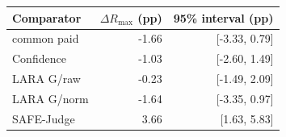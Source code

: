 \begin{tabular}{@{}lrr@{}}
\toprule
Comparator & $\Delta R_{\max}$ (pp) & 95\% interval (pp) \\
\midrule
common paid & -1.66 & [-3.33, 0.79] \\
Confidence & -1.03 & [-2.60, 1.49] \\
LARA G/raw & -0.23 & [-1.49, 2.09] \\
LARA G/norm & -1.64 & [-3.35, 0.97] \\
SAFE-Judge & 3.66 & [1.63, 5.83] \\
\bottomrule
\end{tabular}
